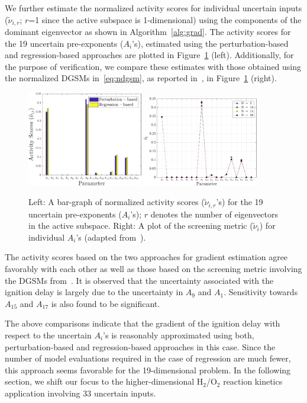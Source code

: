 We further estimate
the normalized activity scores for individual uncertain inputs ($\tilde{\nu}_{i,r}$; $r$=1 since the
active subspace is 1-dimensional)
using the components of the dominant eigenvector as shown in Algorithm~\ref{alg:grad}.
The activity scores for the 19 uncertain pre-exponents ($A_i$'s), estimated
using the perturbation-based and regression-based approaches are plotted in
Figure~\ref{fig:comp_as} (left).  Additionally, for the purpose of
verification, we compare these estimates with those obtained using the
normalized DGSMs in~\eqref{eq:ndgsm}, as reported in~\cite{Vohra:2018}, in
Figure~\ref{fig:comp_as} (right). 
%
\begin{figure}[htbp]
 \begin{center}
  \includegraphics[width=0.45\textwidth]{./Figures/comp_as}
  \includegraphics[width=0.45\textwidth]{./Figures/ub_conv_kinetics_rich}
\caption{Left: A bar-graph of normalized activity scores ($\tilde{\nu}_{i,r}$'s) 
for the 19 uncertain pre-exponents ($A_i$'s); $r$
denotes the number of eigenvectors in the active subspace.
Right: A plot of the screening metric ($\tilde{\nu}_i$) for individual $A_i$'s 
(adapted from~\cite{Vohra:2018}).}
\label{fig:comp_as}
\end{center}
\end{figure}
%
The activity scores based on the two approaches for gradient estimation agree favorably 
with each other as well as those
based on the screening metric involving the DGSMs from~\cite{Vohra:2018}. It is observed that the uncertainty
associated with the ignition delay is largely due to the uncertainty in $A_9$ and $A_1$. Sensitivity towards
$A_{15}$ and $A_{17}$ is also found to be significant. 

The above comparisons indicate that the gradient of the ignition delay with respect to the
uncertain $A_i$'s is reasonably approximated using both, perturbation-based and regression-based
approaches in this case. Since the number of model evaluations required in the case of
regression are much fewer, this approach seems favorable for the 19-dimensional problem. 
In the following section, we shift our focus to 
the higher-dimensional H$_2$/O$_2$ reaction kinetics application involving 33 uncertain inputs. 
